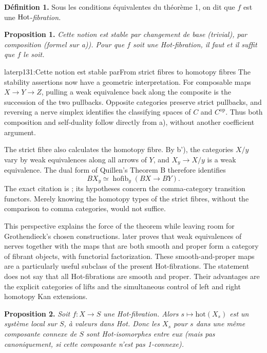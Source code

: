\noindent\textbf{Définition 1.} Sous les conditions équivalentes du théorème 1, on dit que $f$ est une $\mathrm{Hot}$-\textit{fibration.}


\textbf{Proposition 1.} \textit{Cette notion est stable par changement de base (trivial), par composition (formel sur a)). Pour que $f$ soit une \textup{Hot}-fibration, il faut et il suffit que $f$ le soit.}

\begin{dcomment}{later}{p131:Cette notion est stable par}{From strict fibres to homotopy fibres}
The stability assertions now have a geometric interpretation. For composable maps \(X\longrightarrow Y\longrightarrow Z\), pulling a weak equivalence back along the composite is the succession of the two pullbacks. Opposite categories preserve strict pullbacks, and reversing a nerve simplex identifies the classifying spaces of \(C\) and \(C^{\mathrm{op}}\). Thus both composition and self-duality follow directly from a), without another coefficient argument.

The strict fibre also calculates the homotopy fibre. By b'), the categories \(X/y\) vary by weak equivalences along all arrows of \(Y\), and \(X_y\longrightarrow X/y\) is a weak equivalence. The dual form of Quillen's Theorem B therefore identifies
\[
 BX_y \simeq \operatorname{hofib}_y(BX\longrightarrow BY).
\]
The exact citation is \citet[\S1, Theorem B and its corollary]{Quillen1973}; its hypotheses concern the comma-category transition functors. Merely knowing the homotopy types of the strict fibres, without the comparison to comma categories, would not suffice.

This perspective explains the force of the theorem while leaving room for Grothendieck's chosen constructions. \citet[Proposition 4.4]{Cisinski2009LocallyConstant} later proves that weak equivalences of nerves together with the maps that are both smooth and proper form a category of fibrant objects, with functorial factorization. These smooth-and-proper maps are a particularly useful subclass of the present Hot-fibrations. The statement does not say that all Hot-fibrations are smooth and proper. Their advantages are the explicit categories of lifts and the simultaneous control of left and right homotopy Kan extensions.
\end{dcomment}


\textbf{Proposition 2.} \textit{Soit $f : X \longrightarrow S$ une \textup{Hot}-fibration. Alors $s \longmapsto \mathrm{hot}(X_s)$ est un système local sur $S$, à valeurs dans \textup{Hot}. Donc les $X_s$ pour $s$ dans une même composante connexe de $S$ sont \textup{Hot}-isomorphes entre eux (mais pas canoniquement, si cette composante n'est pas \textup{1}-connexe).}

